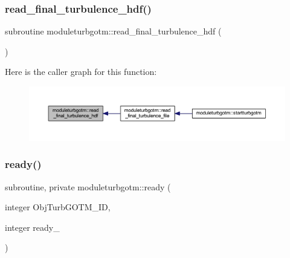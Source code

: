 \subsubsection{\texorpdfstring{read\+\_\+final\+\_\+turbulence\+\_\+hdf()}{read\_final\_turbulence\_hdf()}}
{\footnotesize\ttfamily subroutine moduleturbgotm\+::read\+\_\+final\+\_\+turbulence\+\_\+hdf (\begin{DoxyParamCaption}{ }\end{DoxyParamCaption})\hspace{0.3cm}{\ttfamily [private]}}

Here is the caller graph for this function\+:\nopagebreak
\begin{figure}[H]
\begin{center}
\leavevmode
\includegraphics[width=350pt]{namespacemoduleturbgotm_a8389365bd5c5c531982068da1e23ce6f_icgraph}
\end{center}
\end{figure}
\mbox{\label{namespacemoduleturbgotm_a8b59a232d6c61837f14e169cef43d695}} 
\subsubsection{\texorpdfstring{ready()}{ready()}}
{\footnotesize\ttfamily subroutine, private moduleturbgotm\+::ready (\begin{DoxyParamCaption}\item[{integer}]{Obj\+Turb\+G\+O\+T\+M\+\_\+\+ID,  }\item[{integer}]{ready\+\_\+ }\end{DoxyParamCaption})\hspace{0.3cm}{\ttfamily [private]}}

